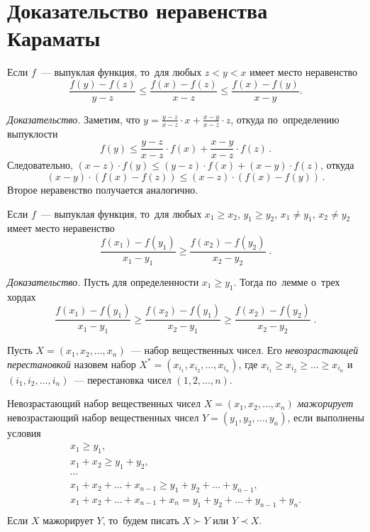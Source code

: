 

\section*{Доказательство неравенства Караматы}


Если $f$~--- выпуклая функция, то~для любых $z < y < x$ имеет место неравенство
\[
    \frac{f(y) - f(z)}{y - z}
\leq
    \frac{f(x) - f(z)}{x - z}
\leq
    \frac{f(x) - f(y)}{x - y}.
\] 

\textit{Доказательство.}
Заметим, что %
\(
    y = \frac{y - z}{x - z} \cdot x + \frac{x - y}{x - z} \cdot z
\),
откуда по~определению выпуклости
\[
    f(y)
\leq
    \frac{y - z}{x - z} \cdot f(x) + \frac{x - y}{x - z} \cdot f(z)
\,.\]
Следовательно,
$(x - z) \cdot f(y) \leq (y - z) \cdot f(x) + (x - y) \cdot f(z)$,
откуда
\[
    (x - y) \cdot (f(x) - f(z))
\leq
    (x - z) \cdot (f(x) - f(y))
\,.\]
Второе неравенство получается аналогично.

Если $f$~--- выпуклая функция, то~для любых
$x_1 \geq x_2$, $y_1 \geq y_2$, $x_1 \neq y_1$, $x_2 \neq y_2$ имеет место
неравенство
\[
    \frac{f(x_1) - f(y_1)}{x_1 - y_1}
\geq
    \frac{f(x_2) - f(y_2)}{x_2 - y_2}
\;.\]

\textit{Доказательство.}
Пусть для определенности $x_1 \geq y_1$.
Тогда по~лемме о~трех хордах
\[
    \frac{f(x_1) - f(y_1)}{x_1 - y_1}
\geq
    \frac{f(x_2) - f(y_1)}{x_2 - y_1}
\geq
    \frac{f(x_2) - f(y_2)}{x_2 - y_2}
\;.\]

Пусть $X = (x_1, x_2, \ldots, x_n)$~--- набор вещественных чисел.
Его \emph{невозрастающей перестановкой} назовем набор
$X^* = (x_{i_1}, x_{i_2}, \ldots, x_{i_n})$, где
$x_{i_1} \geq x_{i_2} \geq \ldots \geq x_{i_n}$
и~$(i_1, i_2, \ldots, i_n)$~--- перестановка чисел $(1, 2, \ldots, n)$.

Невозрастающий набор вещественных чисел $X = (x_1, x_2, \ldots, x_n)$
\emph{мажорирует}
невозрастающий набор вещественных чисел $Y = (y_1, y_2, \ldots, y_n)$,
если выполнены условия
\begin{gather*}
    x_1 \geq y_1
,\\
    x_1 + x_2 \geq y_1 + y_2
,\\ \cdots \\
    x_1 + x_2 + \ldots + x_{n-1} \geq y_1 + y_2 + \ldots + y_{n-1}
,\\
    x_1 + x_2 + \ldots + x_{n-1} + x_n = y_1 + y_2 + \ldots + y_{n-1} + y_n
.\\
\end{gather*}
Если $X$ мажорирует $Y$, то~будем писать $X \succ Y$ или $Y \prec X$.

